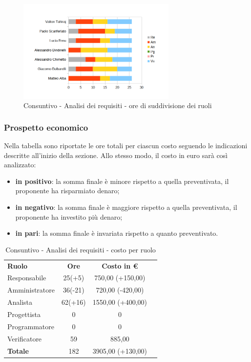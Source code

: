 	\begin{figure} [h!]
	\centering
	\includegraphics[width=0.7\textwidth]{res/img/grafici/consuntivo-barre_ ore analisi requisiti.png}
	\caption{Consuntivo - Analisi dei requisiti - ore di suddivisione dei ruoli} 
\end{figure}


\newpage
\subsubsection{Prospetto economico}
Nella tabella sono riportate le ore totali per ciascun costo seguendo le indicazioni descritte all'inizio della sezione.
Allo stesso modo, il costo in euro sarà così analizzato:
\begin{itemize}
	\item {\bfseries in positivo}: la somma finale è minore rispetto a quella preventivata, il proponente ha risparmiato denaro;
	\item {\bfseries in negativo}: la somma finale è maggiore rispetto a quella preventivata, il proponente ha investito più denaro;
	\item {\bfseries in pari}: la somma finale è invariata rispetto a quanto preventivato. \\
\end{itemize}
\begin{table} [h!]
	\begin{center}
		\begin{tabular} { m{3 cm} c c c  }
			\rowcolor{lightgray}
			\textbf{Ruolo} & \textbf{Ore} & \textbf{Costo in \euro} \\
			Responsabile & 25(+5) & 750,00 (+150,00) \\
			Amministratore & 36(-21) & 720,00 (-420,00)  \\
			Analista & 62(+16) & 1550,00 (+400,00) \\
			Progettista & 0 & 0 \\
			Programmatore & 0 & 0  \\
			Verificatore & 59 & 885,00  \\
			\textbf{Totale} & 182  & 3905,00 (+130,00) \\
			
		\end{tabular}
		\caption{Consuntivo - Analisi dei requisiti - costo per ruolo}
	\end{center}
\end{table}

